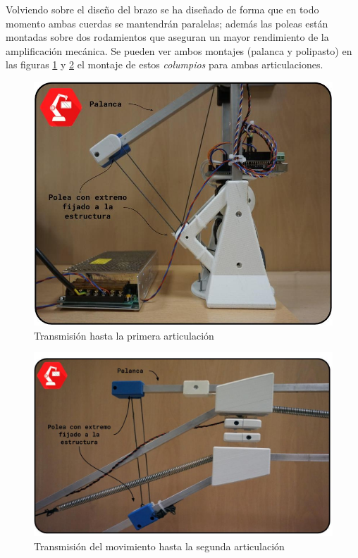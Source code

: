     Volviendo sobre el diseño del brazo se ha diseñado de forma que en todo momento ambas cuerdas se mantendrán paralelas; además las poleas están montadas sobre dos rodamientos que aseguran un mayor rendimiento de la amplificación mecánica. Se pueden ver ambos montajes (palanca y polipasto) en las figuras \ref{fig:Mecanica:columpio_art_uno} y \ref{fig:Mecanica:columpio_art_dos} el montaje de estos \textit{columpios} para ambas articulaciones.

    \begin{minipage}{0.38\textwidth}
        \begin{figure}[H]
            \centering
            \includegraphics[width=\textwidth]{figuras/Imagenes_Mecanica/foto_brazo_7.jpg}
            \caption{Transmisión hasta la primera articulación}
            \label{fig:Mecanica:columpio_art_uno}
        \end{figure}
    \end{minipage}
    \begin{minipage}{0.58\textwidth}\raggedright
        \begin{figure}[H]
            \centering
            \includegraphics[width=\textwidth]{figuras/Imagenes_Mecanica/foto_brazo_9.jpg}
            \caption{Transmisión del movimiento hasta la segunda articulación}
            \label{fig:Mecanica:columpio_art_dos}
        \end{figure}
    \end{minipage}

